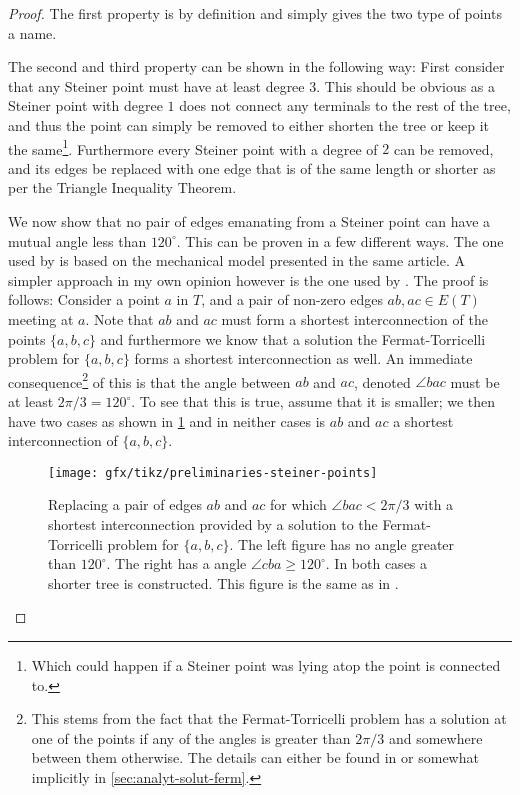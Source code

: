 \begin{proof}
  The first property is by definition and simply gives the two type of points a
  name.

  The second and third property can be shown in the following way: First consider
  that any Steiner point must have at least degree $3$. This should be obvious as
  a Steiner point with degree $1$ does not connect any terminals to the rest of
  the tree, and thus the point can simply be removed to either shorten the tree or
  keep it the same\footnote{Which could happen if a Steiner point was lying atop
    the point is connected to.}. Furthermore every Steiner point with a degree of
  $2$ can be removed, and its edges be replaced with one edge that is of the same
  length or shorter as per the Triangle Inequality
  Theorem\cite{triangleinequality}.

  We now show that no pair of edges emanating from a Steiner point can have a
  mutual angle less than $120^{\circ}$. This can be proven in a few different
  ways. The one used by \textcite{gilbert1968} is based on the mechanical model
  presented in the same article. A simpler approach in my own opinion
  however is the one used by \textcite{brazil2015}. The proof is follows: Consider
  a point $a$ in $T$, and a pair of non-zero edges $ab, ac \in E(T)$ meeting at
  $a$. Note that $ab$ and $ac$ must form a shortest interconnection of the points
  $\{a, b, c\}$ and furthermore we know that a solution the Fermat-Torricelli
  problem for $\{ a, b, c \}$ forms a shortest interconnection as well. An
  immediate consequence\footnote{This stems from the fact that the
    Fermat-Torricelli problem has a solution at one of the points if any of the
    angles is greater than $2 \pi / 3$ and somewhere between them otherwise. The
    details can either be found in \textcite[ch.~1]{brazil2015} or somewhat
    implicitly in \cref{sec:analyt-solut-ferm}.} of this is that the angle between
  $ab$ and $ac$, denoted $\angle bac$ must be at least $2 \pi / 3 = 120^{\circ}$.
  To see that this is true, assume that it is smaller; we then have two cases as
  shown in \cref{fig:preliminaries-steiner-point} and in neither cases is $ab$ and
  $ac$ a shortest interconnection of $\{a, b, c\}$.

  \begin{figure}[htbp]
    \centering
    \texttt{[image: gfx/tikz/preliminaries-steiner-points]}
    \caption[Obtaining shorter trees]{Replacing a pair of edges $ab$ and $ac$ for
      which $\angle bac < 2 \pi / 3$ with a shortest interconnection provided by a
      solution to the Fermat-Torricelli problem for $\{a,b,c\}$. The left figure has
      no angle greater than $120^{\circ}$. The right has a angle $\angle cba \ge
      120^{\circ}$. In both cases a shorter tree is constructed. This figure is the
      same as in
      \textcite[p.~7]{brazil2015}.\label{fig:preliminaries-steiner-point}}
  \end{figure}


\end{proof}
